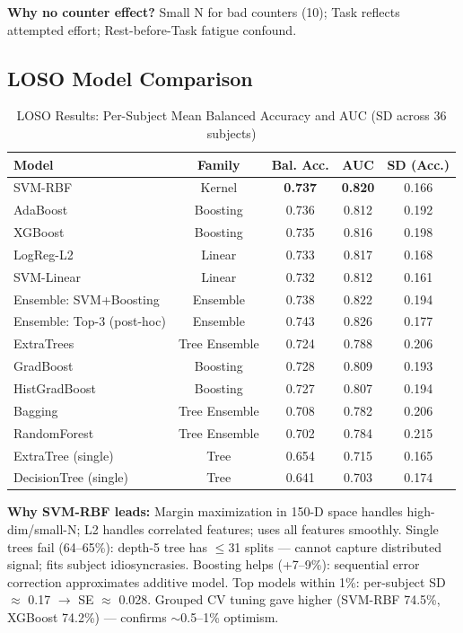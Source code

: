 \documentclass[conference]{IEEEtran}
\begin{document}
\textbf{Why no counter effect?} Small N for bad counters (10); Task reflects attempted effort; Rest-before-Task fatigue confound.

\subsection{LOSO Model Comparison}

\begin{table}[htbp]
\caption{LOSO Results: Per-Subject Mean Balanced Accuracy and AUC (SD across 36 subjects)}
\label{tab:loso}
\centering
\begin{tabular}{@{}lcccc@{}}
\toprule
Model & Family & Bal. Acc. & AUC & SD (Acc.) \\
\midrule
SVM-RBF & Kernel & \textbf{0.737} & \textbf{0.820} & 0.166 \\
AdaBoost & Boosting & 0.736 & 0.812 & 0.192 \\
XGBoost & Boosting & 0.735 & 0.816 & 0.198 \\
LogReg-L2 & Linear & 0.733 & 0.817 & 0.168 \\
SVM-Linear & Linear & 0.732 & 0.812 & 0.161 \\
Ensemble: SVM+Boosting & Ensemble & 0.738 & 0.822 & 0.194 \\
Ensemble: Top-3 (post-hoc) & Ensemble & 0.743 & 0.826 & 0.177 \\
ExtraTrees & Tree Ensemble & 0.724 & 0.788 & 0.206 \\
GradBoost & Boosting & 0.728 & 0.809 & 0.193 \\
HistGradBoost & Boosting & 0.727 & 0.807 & 0.194 \\
Bagging & Tree Ensemble & 0.708 & 0.782 & 0.206 \\
RandomForest & Tree Ensemble & 0.702 & 0.784 & 0.215 \\
ExtraTree (single) & Tree & 0.654 & 0.715 & 0.165 \\
DecisionTree (single) & Tree & 0.641 & 0.703 & 0.174 \\
\bottomrule
\end{tabular}
\end{table}

\textbf{Why SVM-RBF leads:} Margin maximization in 150-D space handles high-dim/small-N; L2 handles correlated features; uses all features smoothly. Single trees fail (64–65\%): depth-5 tree has $\le$31 splits — cannot capture distributed signal; fits subject idiosyncrasies. Boosting helps (+7–9\%): sequential error correction approximates additive model. Top models within 1\%: per-subject SD $\approx$ 0.17 $\rightarrow$ SE $\approx$ 0.028. Grouped CV tuning gave higher (SVM-RBF 74.5\%, XGBoost 74.2\%) — confirms $\sim$0.5–1\% optimism.
\end{document}
